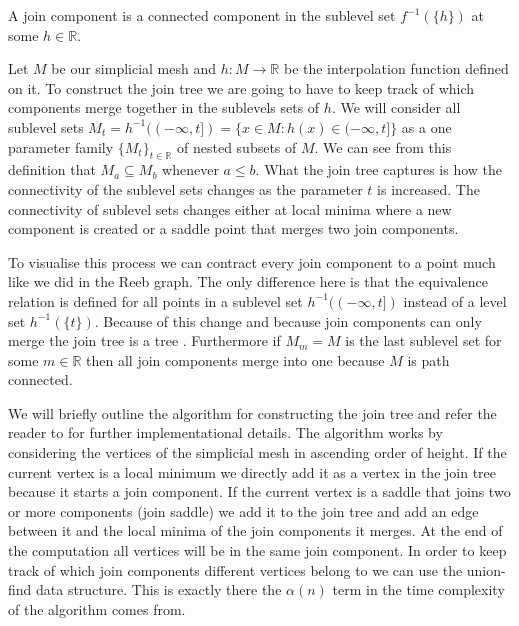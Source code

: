 \begin{defn} A join component is a connected component in the sublevel set $f^{-1}(\{h\})$ at some $h \in \mathbb{R}$.  \end{defn}

Let $M$ be our simplicial mesh and $h : M \to \mathbb{R}$ be the interpolation function defined on it. To construct the join tree we are going to have to keep track of which components merge together in the sublevels sets of $h$. We will consider all sublevel sets $M_t = h^{-1}((-\infty, t]) = \{x \in M : h(x) \in (-\infty, t] \}$ as a one parameter family $\{M_t\}_{t \in \mathbb{R}}$ of nested subsets of $M$. We can see from this definition that $M_a \subseteq M_b$ whenever $a \le b$. What the join tree captures is how the connectivity of the sublevel sets changes as the parameter $t$ is increased. The connectivity of sublevel sets changes either at local minima where a new component is created or a saddle point that merges two join components.


To visualise this process we can contract every join component to a point much like we did in the Reeb graph. The only difference here is that the equivalence relation is defined for all points in a sublevel set $h^{-1}((-\infty, t])$ instead of a level set $h^{-1}(\{t\})$. Because of this change and because join components can only merge the join tree is a tree \cite{comp-topo}. Furthermore if $M_m = M$ is the last sublevel set for some $m \in \mathbb{R}$ then all join components merge into one because $M$ is path connected.



We will briefly outline the algorithm for constructing the join tree and refer the reader to \cite{ct-big-paper} for further implementational details. The algorithm works by considering the vertices of the simplicial mesh in ascending order of height. If the current vertex is a local minimum we directly add it as a vertex in the join tree because it starts a join component. If the current vertex is a saddle that joins two or more components (join saddle) we add it to the join tree and add an edge between it and the local minima of the join components it merges. At the end of the computation all vertices will be in the same join component. In order to keep track of which join components different vertices belong to we can use the union-find data structure. This is exactly there the $\alpha(n)$ term in the time complexity of the algorithm comes from.

